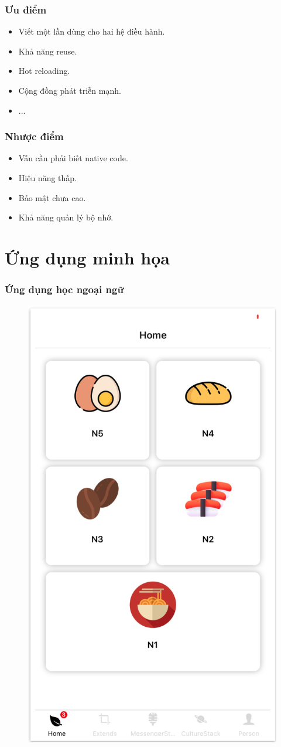 \documentclass{beamer}
\begin{document}
\begin{frame}
\frametitle{Ưu điểm}

\begin{itemize}
    \item<1-> Viết một lần dùng cho hai hệ điều hành.
    \item<2-> Khả năng reuse.
    \item<3-> Hot reloading.
    \item<4-> Cộng đồng phát triễn mạnh.
    \item<5-> ...
\end{itemize}

\end{frame}

\begin{frame}
\frametitle{Nhược điểm}

\begin{itemize}
    \item<1-> Vẫn cần phải biết native code.
    \item<2-> Hiệu năng thấp.
    \item<3-> Bảo mật chưa cao.
    \item<4-> Khả năng quản lý bộ nhớ.
\end{itemize}

\end{frame}


\section{Ứng dụng minh họa}

\begin{frame}
\frametitle{Ứng dụng học ngoại ngữ}

\begin{figure}[h]
	\centering
	\includegraphics[width=.35\textwidth]{demo-1}
\end{figure}

\end{frame}
\end{document}
